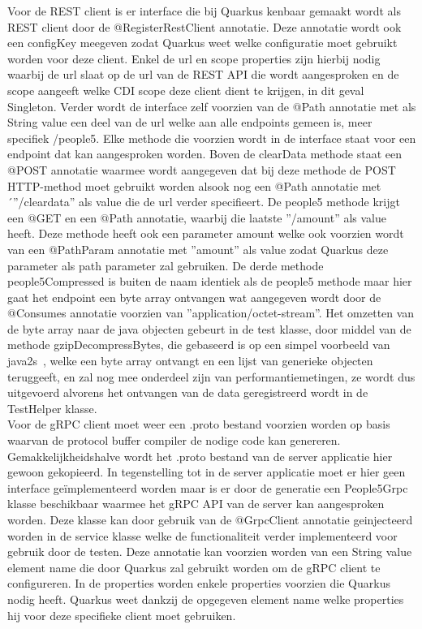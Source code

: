 Voor de REST client is er interface die bij Quarkus kenbaar gemaakt wordt als REST client door de @RegisterRestClient annotatie. Deze annotatie wordt ook een configKey meegeven
zodat Quarkus weet welke configuratie moet gebruikt worden voor deze client.  Enkel de url en scope properties zijn hierbij nodig waarbij de url slaat op de url van de
REST API die wordt aangesproken en de scope aangeeft welke CDI scope deze client dient te krijgen, in dit geval Singleton.
Verder wordt de interface zelf voorzien van de @Path annotatie met als String value een deel van de url welke
aan alle endpoints gemeen is, meer specifiek /people5. Elke methode die voorzien wordt in de interface staat voor een endpoint dat kan aangesproken worden.
Boven de clearData methode staat een @POST annotatie waarmee wordt aangegeven dat bij deze methode de POST HTTP-method moet gebruikt worden alsook
nog een @Path annotatie met ´''/cleardata'' als value die de url verder specifieert. De people5 methode krijgt een @GET en een @Path annotatie, waarbij die laatste ''/{amount}''
als value heeft. Deze methode heeft ook een parameter amount welke ook voorzien wordt van een @PathParam annotatie met ''amount'' als value zodat Quarkus
deze parameter als path parameter zal gebruiken. De derde methode people5Compressed is buiten de naam identiek als de people5 methode maar hier gaat het endpoint een
byte array ontvangen wat aangegeven wordt door de @Consumes annotatie voorzien van ''application/octet-stream''. Het omzetten van de byte array naar de java objecten gebeurt
in de test klasse, door middel van de methode gzipDecompressBytes, die gebaseerd is op een simpel voorbeeld van java2s~\parencite{gzipDecompressie}, welke een byte array ontvangt en een lijst van generieke objecten teruggeeft,
en zal nog mee onderdeel zijn van performantiemetingen, ze wordt dus uitgevoerd alvorens het ontvangen van de data geregistreerd wordt in de TestHelper klasse.
~\autocite{quarkusRESTclient}\\

Voor de gRPC client moet weer een .proto bestand voorzien worden op basis waarvan de protocol buffer compiler de nodige code kan genereren. Gemakkelijkheidshalve wordt het
.proto bestand van de server applicatie hier gewoon gekopieerd. In tegenstelling tot in de server applicatie moet er hier geen interface geïmplementeerd worden maar
is er door de generatie een People5Grpc klasse beschikbaar waarmee het gRPC API van de server kan aangesproken worden. Deze klasse kan door gebruik van de
@GrpcClient annotatie geinjecteerd worden in de service klasse welke de functionaliteit verder implementeerd voor gebruik door de testen. Deze annotatie
kan voorzien worden van een String value element name die door Quarkus zal gebruikt worden om de gRPC client te configureren. In de properties worden enkele properties voorzien
die Quarkus nodig heeft. Quarkus weet dankzij de opgegeven element name welke properties hij voor deze specifieke client moet gebruiken.\newline

